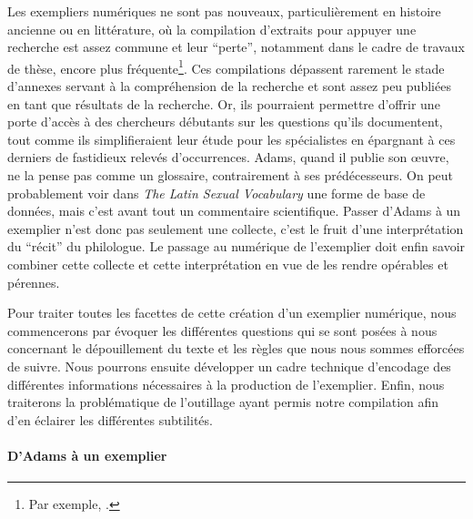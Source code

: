 Les exempliers numériques ne sont pas nouveaux, particulièrement en histoire ancienne ou en littérature, où la compilation d'extraits pour appuyer une recherche est assez commune et leur \enquote{perte}, notamment dans le cadre de travaux de thèse, encore plus fréquente\footnote{Par exemple, \textcite{castelli__2020, montreuil_histoire_2016}.}. Ces compilations dépassent rarement le stade d'annexes servant à la compréhension de la recherche et sont assez peu publiées en tant que résultats de la recherche. Or, ils pourraient permettre d'offrir une porte d'accès à des chercheurs débutants sur les questions qu'ils documentent, tout comme ils simplifieraient leur étude pour les spécialistes en épargnant à ces derniers de fastidieux relevés d'occurrences. Adams, quand il publie son œuvre, ne la pense pas comme un glossaire, contrairement à ses prédécesseurs. On peut probablement voir dans \textit{The Latin Sexual Vocabulary} une forme de base de données, mais c'est avant tout un commentaire scientifique. Passer d'Adams à un exemplier n'est donc pas seulement une collecte, c'est le fruit d'une interprétation du \enquote{récit} du philologue. Le passage au numérique de l'exemplier doit enfin savoir combiner cette collecte et cette interprétation en vue de les rendre opérables et pérennes.

Pour traiter toutes les facettes de cette création d'un exemplier numérique, nous commencerons par évoquer les différentes questions qui se sont posées à nous concernant le dépouillement du texte et les règles que nous nous sommes efforcées de suivre. Nous pourrons ensuite développer un cadre technique d'encodage des différentes informations nécessaires à la production de l'exemplier. Enfin, nous traiterons la problématique de l'outillage ayant permis notre compilation afin d'en éclairer les différentes subtilités.

\paragraph{D'Adams à un exemplier}


